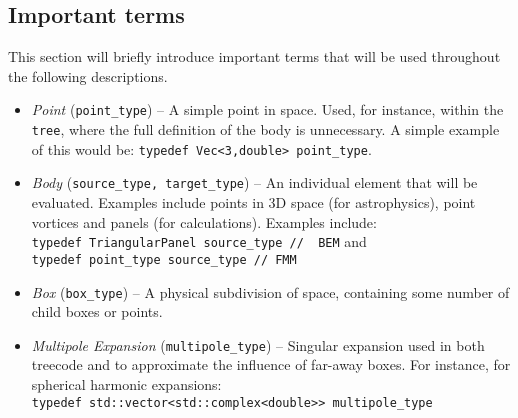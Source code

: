 \subsection{Important terms}\label{subsec:important_terms}

This section will briefly introduce important terms that will be used throughout the following descriptions.

\begin{itemize}

\item \emph{Point} ({\lstinline|point_type|}) -- A simple point in space. Used, for instance, within the {\lstinline|tree|}, where the full definition of the body is unnecessary. A simple example of this would be: {\lstinline|typedef Vec<3,double> point_type|}.


\item \emph{Body} ({\lstinline|source_type, target_type|}) -- An individual element that will be evaluated. Examples include points in 3D space (for astrophysics), point vortices and panels (for {\bem} calculations). Examples include: \\
{\lstinline|typedef TriangularPanel source_type //  BEM|} and \\
{\lstinline|typedef point_type source_type // FMM|}


\item \emph{Box} ({\lstinline|box_type|}) -- A physical subdivision of space, containing some number of child boxes or points.

\item \emph{Multipole Expansion} ({\lstinline|multipole_type|}) -- Singular expansion used in both treecode and {\fmm} to approximate the influence of far-away boxes. For instance, for spherical harmonic expansions: \\ 
{\lstinline|typedef std::vector<std::complex<double>> multipole_type|}


\end{itemize}
